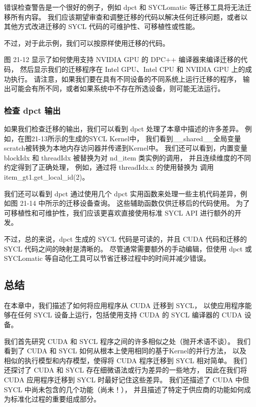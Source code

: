 错误检查警告是一个很好的例子，例如 dpct 和 SYCLomatic 等迁移工具将无法迁移所有内容。 
我们应该期望审查和调整迁移的代码以解决任何迁移问题，或者以其他方式改进迁移的 SYCL 代码的可维护性、可移植性或性能。

不过，对于此示例，我们可以按原样使用迁移的代码。

图 21-12 显示了如何使用支持 NVIDIA GPU 的 DPC++ 编译器来编译迁移的代码，
然后显示我们的迁移程序在 Intel GPU、Intel CPU 和 NVIDIA GPU 上的成功执行。 
请注意，如果我们要在具有不同设备的不同系统上运行迁移的程序，
输出可能会有所不同，或者如果系统中不存在所选设备，则可能无法运行。

\subsubsection{检查 dpct 输出}

如果我们检查迁移的输出，我们可以看到 dpct 处理了本章中描述的许多差异。 
例如，在图21-13所示的生成的SYCL Kernel中，
我们看到\_\_shared\_\_全局变量scratch被转换为本地内存访问器并传递到Kernel中。 
我们还可以看到，内置变量 blockIdx 和 threadIdx 被替换为对 nd\_item 类实例的调用，
并且连续维度的不同约定得到了正确处理，
例如，通过将 threadIdx.x 的使用替换为 调用 item\_gt1.get\_local\_id(2)。

我们还可以看到 dpct 通过使用几个 dpct 实用函数来处理一些主机代码差异，例如图 21-14 中所示的迁移设备查询。 
这些辅助函数仅供迁移后的代码使用。 为了可移植性和可维护性，我们应该更喜欢直接使用标准 SYCL API 进行额外的开发。

不过，总的来说，dpct 生成的 SYCL 代码是可读的，并且 CUDA 代码和迁移的 SYCL 代码之间的映射是清晰的。 
尽管通常需要额外的手动编辑，但使用 dpct 或 SYCLomatic 等自动化工具可以节省迁移过程中的时间并减少错误。

\subsection{总结}
在本章中，我们描述了如何将应用程序从 CUDA 迁移到 SYCL，
以使应用程序能够在任何 SYCL 设备上运行，包括使用支持 CUDA 的 SYCL 编译器的 CUDA 设备。

我们首先研究 CUDA 和 SYCL 程序之间的许多相似之处（抛开术语不谈）。 
我们看到了 CUDA 和 SYCL 如何从根本上使用相同的基于Kernel的并行方法，
以及相似的执行模型和内存模型，使得将 CUDA 程序迁移到 SYCL 相对简单。 
我们还探讨了 CUDA 和 SYCL 存在细微语法或行为差异的一些地方，
因此在我们将 CUDA 应用程序迁移到 SYCL 时最好记住这些差异。 
我们还描述了 CUDA 中但 SYCL 中尚未包含的几个功能（尚未！），
并且描述了特定于供应商的功能如何成为标准化过程的重要组成部分。

